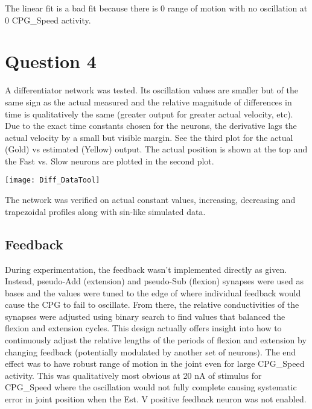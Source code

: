 \documentclass[12pt, letterpaper, oneside, notitlepage, onecolumn]{article}
\begin{document}
The linear fit is a bad fit because there is 0 range of motion with no oscillation at 0 CPG\_Speed activity.

\section{Question 4}

A differentiator network was tested. Its oscillation values are smaller but of the same sign as the actual measured and the relative magnitude of differences in time is qualitatively the same (greater output for greater actual velocity, etc). Due to the exact time constants chosen for the neurons, the derivative lags the actual velocity by a small but visible margin. See the third plot for the actual (Gold) vs estimated (Yellow) output. The actual position is shown at the top and the Fast vs. Slow neurons are plotted in the second plot.

\texttt{[image: Diff\_DataTool]}

The network was verified on actual constant values, increasing, decreasing and trapezoidal profiles along with sin-like simulated data.

\subsection{Feedback}

During experimentation, the feedback wasn't implemented directly as given. Instead, pseudo-Add (extension) and pseudo-Sub (flexion) synapses were used as bases and the values were tuned to the edge of where individual feedback would cause the CPG to fail to oscillate. From there, the relative conductivities of the synapses were adjusted using binary search to find values that balanced the flexion and extension cycles. This design actually offers insight into how to continuously adjust the relative lengths of the periods of flexion and extension by changing feedback (potentially modulated by another set of neurons). The end effect was to have robust range of motion in the joint even for large CPG\_Speed activity. This was qualitatively most obvious at 20 nA of stimulus for CPG\_Speed where the oscillation would not fully complete causing systematic error in joint position when the Est. V positive feedback neuron was not enabled.
\end{document}
